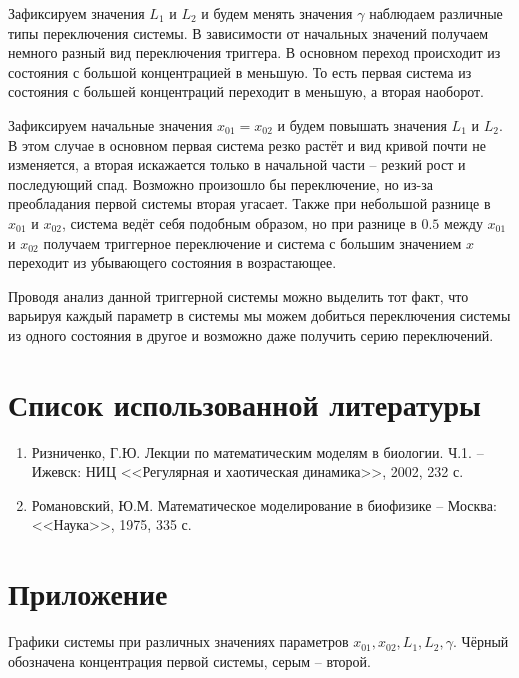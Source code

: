 Зафиксируем значения \( L_1 \) и \( L_2 \) и будем менять значения 
\( \gamma \) наблюдаем различные типы переключения системы. В зависимости 
от начальных значений получаем немного разный вид переключения триггера. 
В основном переход происходит из состояния с большой концентрацией в 
меньшую. То есть первая система из состояния с большей концентраций 
переходит в меньшую, а вторая наоборот.

Зафиксируем начальные значения \( x_{01} = x_{02} \) и будем повышать 
значения \( L_1 \) и \( L_2 \). В этом случае в основном первая система 
резко растёт и вид кривой почти не изменяется, а вторая искажается только в 
начальной части -- резкий рост и последующий спад. Возможно произошло бы 
переключение, но из-за преобладания первой системы вторая угасает. 
Также при небольшой разнице в \( x_{01} \) и \( x_{02} \), система ведёт себя 
подобным образом, но при разнице в \( 0.5 \) между \( x_{01} \) и \( x_{02} \) 
получаем триггерное переключение и система с большим значением \( x \) 
переходит из убывающего состояния в возрастающее.

Проводя анализ данной триггерной системы можно выделить тот факт, что 
варьируя каждый параметр в системы мы можем добиться переключения системы 
из одного состояния в другое и возможно даже получить серию переключений.

\newpage

\section{Список использованной литературы}
    \begin{enumerate}
        \item Ризниченко, Г.Ю. Лекции по математическим моделям в 
            биологии. Ч.1. -- Ижевск: НИЦ
            <<Регулярная и хаотическая динамика>>, 2002, 232 с.
        \item Романовский, Ю.М. Математическое моделирование в биофизике
            -- Москва: <<Наука>>, 1975, 335 с.
    \end{enumerate}

\newpage

\section{Приложение}

Графики системы при различных значениях параметров 
\( x_{01}, x_{02}, L_1, L_2, \gamma \). Чёрный обозначена концентрация 
первой системы, серым -- второй.

